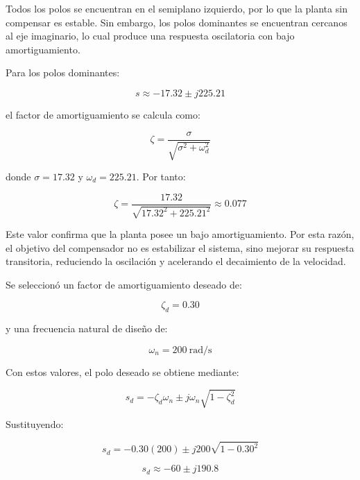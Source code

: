 \documentclass[journal]{IEEEtran}
\begin{document}
Todos los polos se encuentran en el semiplano izquierdo, por lo que la planta sin compensar es estable. Sin embargo, los polos dominantes se encuentran cercanos al eje imaginario, lo cual produce una respuesta oscilatoria con bajo amortiguamiento.

Para los polos dominantes:

\begin{equation}
s \approx -17.32 \pm j225.21
\end{equation}

el factor de amortiguamiento se calcula como:

\begin{equation}
\zeta =
\frac{\sigma}{\sqrt{\sigma^2+\omega_d^2}}
\end{equation}

donde $\sigma=17.32$ y $\omega_d=225.21$. Por tanto:

\begin{equation}
\zeta =
\frac{17.32}{\sqrt{17.32^2+225.21^2}}
\approx 0.077
\end{equation}

Este valor confirma que la planta posee un bajo amortiguamiento. Por esta razón, el objetivo del compensador no es estabilizar el sistema, sino mejorar su respuesta transitoria, reduciendo la oscilación y acelerando el decaimiento de la velocidad.

Se seleccionó un factor de amortiguamiento deseado de:

\begin{equation}
\zeta_d = 0.30
\end{equation}

y una frecuencia natural de diseño de:

\begin{equation}
\omega_n = 200 \ \text{rad/s}
\end{equation}

Con estos valores, el polo deseado se obtiene mediante:

\begin{equation}
s_d=-\zeta_d\omega_n \pm j\omega_n\sqrt{1-\zeta_d^2}
\end{equation}

Sustituyendo:

\begin{equation}
s_d = -0.30(200) \pm j200\sqrt{1-0.30^2}
\end{equation}

\begin{equation}
s_d \approx -60 \pm j190.8
\end{equation}
\end{document}
